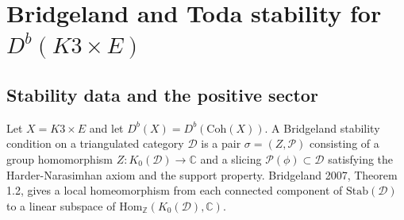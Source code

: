 
\providecommand{\Db}{D^{b}}
\providecommand{\Coh}{\mathrm{Coh}}
\providecommand{\Stab}{\mathrm{Stab}}
\providecommand{\Mum}{\mathcal{M}}
\providecommand{\HH}{\mathbb{H}}
\providecommand{\CoHA}{\mathrm{CoHA}}
\providecommand{\BPS}{\mathrm{BPS}}
\providecommand{\DT}{\mathrm{DT}}
\providecommand{\PT}{\mathrm{PT}}
\providecommand{\kBKM}{\kappa_{\mathrm{BKM}}}
\providecommand{\kch}{\kappa_{\mathrm{ch}}}
\providecommand{\kcat}{\kappa_{\mathrm{cat}}}
\providecommand{\kfib}{\kappa_{\mathrm{fiber}}}
\providecommand{\Yp}{Y^{+}}
\providecommand{\CY}{\mathrm{CY}}
\providecommand{\ChirAlg}{\mathrm{ChirAlg}}
\providecommand{\Phifun}{\Phi}
\providecommand{\cO}{\mathcal{O}}

\section*{Bridgeland and Toda stability for $\Db(K3\times E)$}

\subsection*{Stability data and the positive sector}

Let $X=K3\times E$ and let $\Db(X)=\Db(\Coh(X))$.  A Bridgeland
stability condition on a triangulated category $\mathcal D$ is a pair
$\sigma=(Z,\mathcal P)$ consisting of a group homomorphism
$Z\colon K_0(\mathcal D)\to\mathbb C$ and a slicing
$\mathcal P(\phi)\subset\mathcal D$ satisfying the
Harder-Narasimhan axiom and the support property.  Bridgeland 2007,
Theorem 1.2, gives a local homeomorphism from each connected component
of $\Stab(\mathcal D)$ to a linear subspace of
$\mathrm{Hom}_{\mathbb Z}(K_0(\mathcal D),\mathbb C)$.

